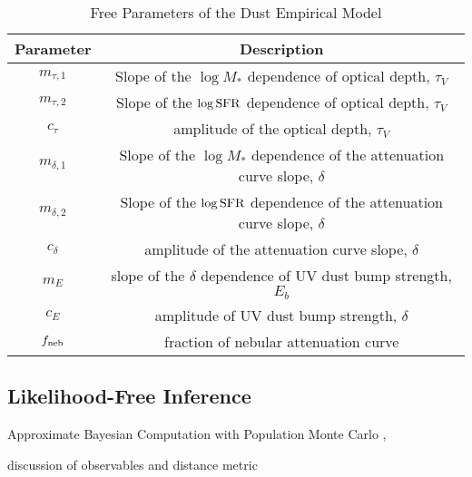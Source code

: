 \begin{table}
    \caption{Free Parameters of the Dust Empirical Model} 
    \begin{center}
        \begin{tabular}{cc} \toprule
            Parameter & Description \\[3pt] \hline\hline
            $m_{\tau,1}$ & Slope of the $\log M_*$ dependence of optical depth, $\tau_V$\\
            $m_{\tau,2}$ & Slope of the $\log {\rm SFR}$ dependence of optical depth, $\tau_V$\\
            $c_{\tau}$ & amplitude of the optical depth, $\tau_V$\\
            $m_{\delta,1}$ & Slope of the $\log M_*$ dependence of the attenuation curve slope, $\delta$\\
            $m_{\delta,2}$ & Slope of the $\log {\rm SFR}$ dependence of the attenuation curve slope, $\delta$\\
            $c_{\delta}$ & amplitude of the attenuation curve slope, $\delta$\\
            $m_{E}$ & slope of the $\delta$ dependence of UV dust bump strength, $E_b$\\
            $c_{E}$ & amplitude of UV dust bump strength, $\delta$\\
            $f_{\rm neb}$ & fraction of nebular attenuation curve\\
            \hline
        \end{tabular} \label{tab:free_param}
    \end{center}
\end{table}

\subsection{Likelihood-Free Inference} 
Approximate Bayesian Computation with Population Monte Carlo \cite{hahn2017a},

discussion of observables and distance metric 
\cite{ishida2015} 


